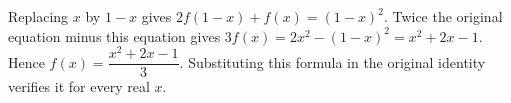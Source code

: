 Replacing $x$ by $1-x$ gives $2f(1-x)+f(x)=(1-x)^2$. Twice the original equation minus this equation gives $3f(x)=2x^2-(1-x)^2=x^2+2x-1$. Hence $\boxed{f(x)=\dfrac{x^2+2x-1}{3}}$. Substituting this formula in the original identity verifies it for every real $x$.
